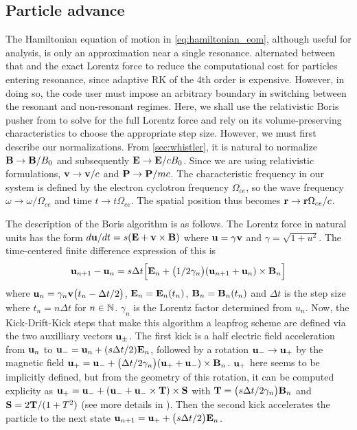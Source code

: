 \subsection{Particle advance}
The Hamiltonian equation of motion in \cref{eq:hamiltonian_eom}, although useful
for analysis, is only an approximation near a single resonance. \cite{Roth1999}
alternated between that and the exact Lorentz force to reduce the computational cost for particles entering resonance, since adaptive RK of the 4th order is
expensive. However, in doing so, the code user must impose an arbitrary boundary
in switching between the resonant and non-resonant regimes. Here, we shall use
the relativistic Boris pusher from \cite{Ripperda2018} to solve for the full
Lorentz force and rely on its volume-preserving characteristics to choose the
appropriate step size. However, we must first describe our normalizations. From
\cref{sec:whistler}, it is natural to normalize $\vb{B}\to\vb{B}/B_0$ and
subsequently $\vb{E}\to \vb{E}/cB_0$. Since we are using relativistic
formulations, $\vb{v}\to\vb{v}/c$ and $\vb{P}\to\vb{P}/mc$. The characteristic
frequency in our system is defined by the electron cyclotron frequency
$\Omega_{ce}$, so the wave frequency $\omega\to\omega/\Omega_{ce}$ and time
$t\to t\Omega_{ce}$. The spatial position thus becomes $\vb{r}\to\vb{r}\Omega_{ce}/c$.

The description of the Boris algorithm is as follows. The Lorentz force in
natural units has the form $d\vb{u}/dt=s\qty(\vb{E}+\vb{v}\times\vb{B})$ where
$\vb{u}=\gamma\vb{v}$ and $\gamma=\sqrt{1+u^2}$. The time-centered finite difference expression of this is
\begin{equation}
 \vb{u}_{n+1}-\vb{u}_n=s\Delta
t\qty[\vb{E}_n+\qty(1/2\gamma_n)\qty(\vb{u}_{n+1}+\vb{u}_n)\times\vb{B}_n]
\end{equation}
 where $\vb{u}_n=\gamma_n\vb{v}\qty(t_n-\Delta t/2)$, $\vb{E}_n=\vb{E}_n(t_n)$,
$\vb{B}_n=\vb{B}_n\qty(t_n)$ and $\Delta t$ is the step size where
$t_n=n\Delta t$ for $n\in\mathbb{N}$. $\gamma_n$ is the Lorentz factor determined from
$u_n$. Now, the Kick-Drift-Kick steps that make this algorithm a leapfrog scheme
are defined via the two auxilliary vectors $\vb{u}_\pm$. The first kick is a
half electric field acceleration from $\vb{u}_n$ to $\vb{u}_-=\vb{u}_n+(s\Delta
t/2)\vb{E}_n$, followed by a rotation $\vb{u}_-\to\vb{u}_+$ by the magnetic
field $\vb{u}_+=\vb{u}_-+\qty(\Delta
t/2\gamma_n)(\vb{u}_++\vb{u}_-)\times\vb{B}_n$. $\vb{u}_+$ here seems to be
implicitly defined, but from the geometry of this rotation, it can be computed
explicity as $\vb{u}_+=\vb{u}_-+\qty(\vb{u}_-+\vb{u}_-\times\vb{T})\times\vb{S}$
with $\vb{T}=\qty(s\Delta t/2\gamma_n)\vb{B}_n$ and $\vb{S}=2\vb{T}/(1+T^2)$
(see more details in \cite{Birdsall&Langdon1985}). Then the second kick accelerates the particle to the next state $\vb{u}_{n+1}=\vb{u}_++\qty(s\Delta
t/2)\vb{E}_n$.

